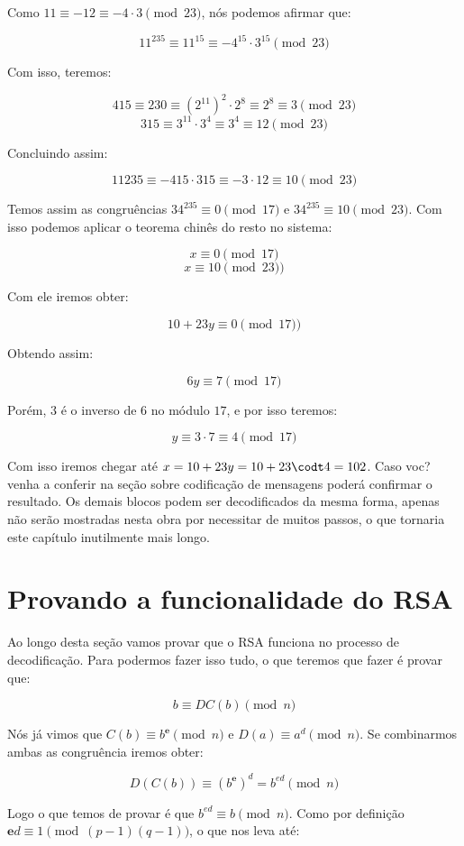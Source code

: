 Como $ 11 \equiv -12 \equiv -4 \cdot 3 \pmod{23}$, n\'os podemos afirmar que:

$$11^{235} \equiv 11^{15} \equiv -4^{15} \cdot 3^{15}\pmod{23}$$

Com isso, teremos:

$$415 \equiv 230 \equiv (2^{11})^2 \cdot 2^8 \equiv 2^8 \equiv 3 \pmod{23}$$
$$315 \equiv 3^{11} \cdot 3^4 \equiv 3^4 \equiv 12 \pmod{23}$$

Concluindo assim:

$$11235 \equiv -415 \cdot 315 \equiv -3 \cdot 12 \equiv 10 \pmod{23}$$

Temos assim as congru\^encias $34^{235} \equiv 0 \pmod{17}$ e $34^{235} \equiv 10 \pmod{23}$. Com isso podemos aplicar o teorema chin\^es do resto no sistema:

$$x \equiv 0 \pmod{17}$$
$$x \equiv 10 \pmod{23})$$

Com ele iremos obter: 

$$10 + 23y \equiv 0 \pmod{17})$$

Obtendo assim:

$$6y \equiv 7 \pmod{17}$$

Por\'em, $3$ \'e o inverso de $6$ no m\'odulo $17$, e por isso teremos:

$$y \equiv 3 \cdot 7 \equiv 4 \pmod{17}$$

Com isso iremos chegar at\'e $x = 10 + 23y = 10 + 23 \codt 4 = 102$. Caso voc? venha a conferir na se\c{c}\~ao sobre codifica\c{c}\~ao de mensagens poder\'a confirmar o resultado. Os demais blocos podem ser decodificados da mesma forma, apenas n\~ao ser\~ao mostradas nesta obra por necessitar de muitos passos, o que tornaria este cap\'itulo inutilmente mais longo.

\section{Provando a funcionalidade do RSA}

Ao longo desta se\c{c}\~ao vamos provar que o RSA funciona no processo de decodifica\c{c}\~ao. Para podermos fazer isso tudo, o que teremos que fazer \'e provar que:

$$b \equiv DC(b) \pmod{n}$$

N\'os j\'a vimos que $C(b) \equiv b^\textbf{e} \pmod{n}$ e $D(a) \equiv a^d\pmod{n}$. Se combinarmos ambas as congru\^encia iremos obter:

$$D(C(b)) \equiv {(b^\textbf{e})}^d = b^{ed}\pmod{n}$$

Logo o que temos de provar \'e que $b^{ed} \equiv b \pmod{n}$. Como por defini\c{c}\~ao $\textbf{e}d \equiv 1 \pmod{(p-1)(q-1)}$, o que nos leva at\'e:

